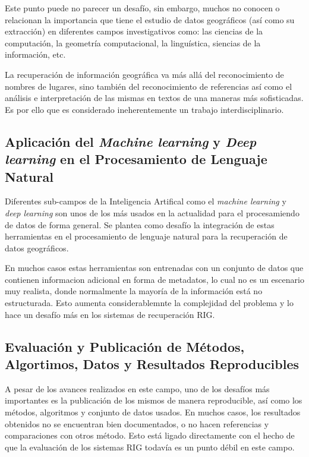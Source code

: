 \documentclass{llncs}
\begin{document}
Este punto puede no parecer un desafío, sin embargo, muchos no conocen o relacionan
la importancia que tiene el estudio de datos geográficos (así como su extracción)
en diferentes campos investigativos como: las ciencias de la computación, la 
geometría computacional, la linguística, siencias de la información, etc.

La recuperación de información geográfica va más allá del
reconocimiento de nombres de lugares, sino también del reconocimiento de referencias así
como el análisis e interpretación de las mismas en textos de una maneras más
sofisticadas. Es por ello que es considerado ineherentemente un trabajo
interdisciplinario.

\subsection{Aplicación del \emph{Machine learning} y \emph{Deep learning} en el
Procesamiento de Lenguaje Natural}\label{sec:ml}

Diferentes sub-campos de la Inteligencia Artifical como el \emph{machine
learning} y \emph{deep learning} son unos de los más usados en la actualidad
para el procesamiendo de datos de forma general. Se plantea como desafío la
integración de estas herramientas en el procesamiento de lenguaje natural para
la recuperación de datos geográficos.

En muchos casos estas herramientas son entrenadas con un conjunto de datos que
contienen informacion adicional en forma de metadatos, lo cual no es un escenario
muy realista, donde normalmente la mayoría de la información está no estructurada.
Esto aumenta considerablemnte la complejidad del problema y lo hace un desafío más
en los sistemas de recuperación RIG.

\subsection{Evaluación y Publicación de Métodos, Algortimos, Datos y
Resultados Reproducibles}\label{sec:publ}

A pesar de los avances realizados en este campo, uno de los desafíos más
importantes es la publicación de los mismos de manera reproducible, así como
los métodos, algoritmos y conjunto de datos usados. En muchos casos, los
resultados obtenidos no se encuentran bien documentados, o no hacen referencias
y comparaciones con otros método. Esto está ligado directamente con el hecho de
que la evaluación de los sistemas RIG todavía
es un punto débil en este campo.
\end{document}
